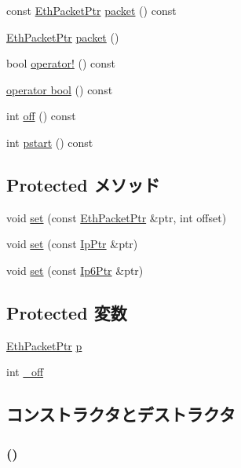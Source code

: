 \begin{DoxyCompactItemize}
\item 
const \hyperlink{classRefCountingPtr}{EthPacketPtr} \hyperlink{classNet_1_1UdpPtr_a13e32a6fa7b2f1b41d1d8dc32d8fda9e}{packet} () const 
\item 
\hyperlink{classRefCountingPtr}{EthPacketPtr} \hyperlink{classNet_1_1UdpPtr_a549ac5c293e8047f1be38ca356e160da}{packet} ()
\item 
bool \hyperlink{classNet_1_1UdpPtr_ac8b1d32dbd52d431450c70b151cfa205}{operator!} () const 
\item 
\hyperlink{classNet_1_1UdpPtr_aa385aa18f5e42db5a415c25a90f4193d}{operator bool} () const 
\item 
int \hyperlink{classNet_1_1UdpPtr_a81fa7ab0c6e92d4496ee915a8a3705f9}{off} () const 
\item 
int \hyperlink{classNet_1_1UdpPtr_ae6fc8073bc02ff3fd03030e0936d56eb}{pstart} () const 
\end{DoxyCompactItemize}
\subsection*{Protected メソッド}
\begin{DoxyCompactItemize}
\item 
void \hyperlink{classNet_1_1UdpPtr_a777f6c709e0743045ba3536e4e184d09}{set} (const \hyperlink{classRefCountingPtr}{EthPacketPtr} \&ptr, int offset)
\item 
void \hyperlink{classNet_1_1UdpPtr_a0a0778623a259833ee4dc0317212ffec}{set} (const \hyperlink{classNet_1_1IpPtr}{IpPtr} \&ptr)
\item 
void \hyperlink{classNet_1_1UdpPtr_aff41448998f095ea26efa08f89bb1c7d}{set} (const \hyperlink{classNet_1_1Ip6Ptr}{Ip6Ptr} \&ptr)
\end{DoxyCompactItemize}
\subsection*{Protected 変数}
\begin{DoxyCompactItemize}
\item 
\hyperlink{classRefCountingPtr}{EthPacketPtr} \hyperlink{classNet_1_1UdpPtr_a764b18a7236ca83fd4bd750516da7d09}{p}
\item 
int \hyperlink{classNet_1_1UdpPtr_ae333e6fee474f238b35b4bf86e60a8ee}{\_\-off}
\end{DoxyCompactItemize}


\subsection{コンストラクタとデストラクタ}
\hypertarget{classNet_1_1UdpPtr_abcd425aa7abed2d3c310a9a911ee3dd8}{
\subsubsection[{UdpPtr}]{ ()}}
\label{classNet_1_1UdpPtr_abcd425aa7abed2d3c310a9a911ee3dd8}



